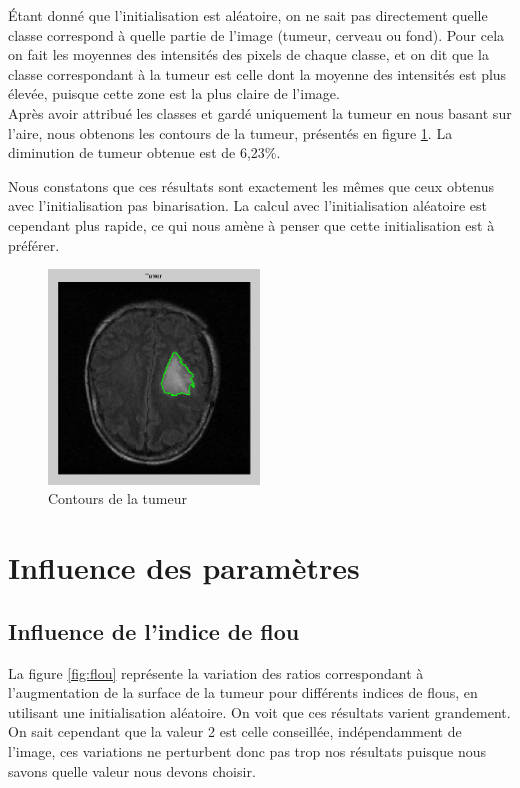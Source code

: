		Étant donné que l'initialisation est aléatoire, on ne sait pas directement quelle classe correspond à quelle partie de l'image (tumeur, cerveau ou fond). Pour cela on fait les moyennes des intensités des pixels de chaque classe, et on dit que la classe correspondant à la tumeur est celle dont la moyenne des intensités est plus élevée, puisque cette zone est la plus claire de l'image.\\

		Après avoir attribué les classes et gardé uniquement la tumeur en nous basant sur l'aire, nous obtenons les contours de la tumeur, présentés en figure \ref{fig:fcm_tumeur_rand}. La diminution de tumeur obtenue est de 6,23\%.

		Nous constatons que ces résultats sont exactement les mêmes que ceux obtenus avec l'initialisation pas binarisation. La calcul avec l'initialisation aléatoire est cependant plus rapide, ce qui nous amène à penser que cette initialisation est à préférer.

		\begin{figure}[h]
			\centering
			\includegraphics[width=0.5\textwidth]{images/2-tumeur-rand.png}
			\caption{Contours de la tumeur}
			\label{fig:fcm_tumeur_rand}
		\end{figure}


\section{Influence des paramètres} %
\label{sub:influence_des_param_tres}
	\subsection{Influence de l'indice de flou} %
	\label{ssub:influence_de_l_indice_de_flou}
		La figure \ref{fig:flou} représente la variation des ratios correspondant à l'augmentation de la surface de la tumeur pour différents indices de flous, en utilisant une initialisation aléatoire. On voit que ces résultats varient grandement. On sait cependant que la valeur 2 est celle conseillée, indépendamment de l'image, ces variations ne perturbent donc pas trop nos résultats puisque nous savons quelle valeur nous devons choisir.

